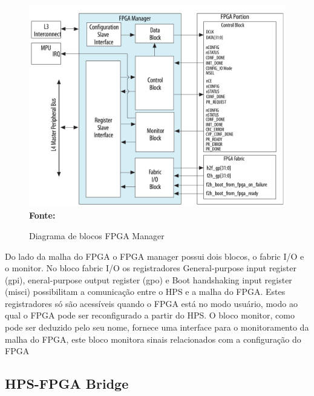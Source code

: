 \begin{figure}[ht]
	\caption{Diagrama de blocos FPGA Manager }
	\begin{center}
		\includegraphics[scale=0.35]{imagens/fpgamanager.png}\\
		{\small \textbf{Fonte:} }
    \end{center}\label{fig:fpgamanager}
\end{figure}


Do lado da malha do FPGA o FPGA manager possui dois blocos, o fabric I/O e o monitor. No bloco fabric I/O os registradores General-purpose input register (gpi), eneral-purpose output register (gpo) e Boot handshaking input register (misci) possibilitam a comunicação entre o HPS e a malha do FPGA\@. Estes registradores só são acessíveis quando o FPGA está no modo usuário, modo ao qual o FPGA pode ser reconfigurado a partir do HPS. O bloco monitor, como pode ser deduzido pelo seu nome, fornece uma interface para o monitoramento da malha do FPGA, este bloco monitora sinais relacionados com a configuração do FPGA 



\subsection{HPS-FPGA Bridge}


